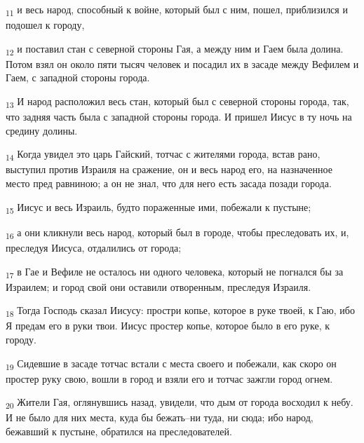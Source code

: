 \begin{tcolorbox}
\textsubscript{11} и весь народ, способный к войне, который был с ним, пошел, приблизился и подошел к городу,
\end{tcolorbox}
\begin{tcolorbox}
\textsubscript{12} и поставил стан с северной стороны Гая, а между ним и Гаем была долина. Потом взял он около пяти тысяч человек и посадил их в засаде между Вефилем и Гаем, с западной стороны города.
\end{tcolorbox}
\begin{tcolorbox}
\textsubscript{13} И народ расположил весь стан, который был с северной стороны города, так, что задняя часть была с западной стороны города. И пришел Иисус в ту ночь на средину долины.
\end{tcolorbox}
\begin{tcolorbox}
\textsubscript{14} Когда увидел это царь Гайский, тотчас с жителями города, встав рано, выступил против Израиля на сражение, он и весь народ его, на назначенное место пред равниною; а он не знал, что для него есть засада позади города.
\end{tcolorbox}
\begin{tcolorbox}
\textsubscript{15} Иисус и весь Израиль, будто пораженные ими, побежали к пустыне;
\end{tcolorbox}
\begin{tcolorbox}
\textsubscript{16} а они кликнули весь народ, который был в городе, чтобы преследовать их, и, преследуя Иисуса, отдалились от города;
\end{tcolorbox}
\begin{tcolorbox}
\textsubscript{17} в Гае и Вефиле не осталось ни одного человека, который не погнался бы за Израилем; и город свой они оставили отворенным, преследуя Израиля.
\end{tcolorbox}
\begin{tcolorbox}
\textsubscript{18} Тогда Господь сказал Иисусу: простри копье, которое в руке твоей, к Гаю, ибо Я предам его в руки твои. Иисус простер копье, которое было в его руке, к городу.
\end{tcolorbox}
\begin{tcolorbox}
\textsubscript{19} Сидевшие в засаде тотчас встали с места своего и побежали, как скоро он простер руку свою, вошли в город и взяли его и тотчас зажгли город огнем.
\end{tcolorbox}
\begin{tcolorbox}
\textsubscript{20} Жители Гая, оглянувшись назад, увидели, что дым от города восходил к небу. И не было для них места, куда бы бежать--ни туда, ни сюда; ибо народ, бежавший к пустыне, обратился на преследователей.
\end{tcolorbox}
